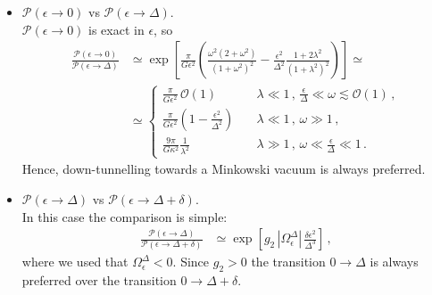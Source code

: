 \documentclass[11pt,a4paper]{article}
\begin{document}
\begin{itemize}
\item $\mathcal{P}(\epsilon \rightarrow 0)$ vs $\mathcal{P}(\epsilon \rightarrow \Delta)$.\\
$\mathcal{P}\left(\epsilon \rightarrow 0\right)$ is exact in $\epsilon$, so
\begin{align}
\frac{\mathcal{P}\left(\epsilon \rightarrow 0\right)}{\mathcal{P}\left(\epsilon \rightarrow\Delta\right)} & \simeq \exp\left[\frac{\pi}{G \epsilon^2} \left(\frac{\omega^2(2 + \omega^2)}{(1 + \omega^2)^2} - \frac{\epsilon^2}{\Delta^2} \frac{1 + 2 \lambda^2}{(1 + \lambda^2)^2}\right)\right] \simeq \nonumber\\
& \simeq \begin{cases} \frac{\pi}{G \epsilon^2} \, \mathcal{O}(1) \quad &\lambda \ll 1 \,, \, \frac{\epsilon}{\Delta} \ll \omega \lesssim \mathcal{O}(1) \,, \\
\frac{\pi}{G \epsilon^2} \left(1 - \frac{\epsilon^2}{\Delta^2}\right)  \quad &\lambda \ll 1 \,, \, \omega \gg 1 \,, \\
\frac{9 \pi}{G \kappa^2} \frac{1}{\lambda^2} \quad &\lambda \gg 1 \,, \, \omega \ll \frac{\epsilon}{\Delta} \ll 1 \,.
\end{cases}
\end{align}
Hence, down-tunnelling towards a Minkowski vacuum is always preferred.

\item $\mathcal{P}(\epsilon \rightarrow \Delta)$ vs $\mathcal{P}(\epsilon \rightarrow \Delta + \delta)$.\\
In this case the comparison is simple:
\begin{align}
\frac{\mathcal{P}\left(\epsilon \rightarrow \Delta\right)}{\mathcal{P}\left(\epsilon \rightarrow \Delta + \delta\right)} & \simeq \exp\left[g_2 \, \left|\Omega_{\epsilon}^{\Delta}\right| \, \frac{\delta \epsilon^2}{\Delta^3}\right] \,,
\end{align}
where we used that $\Omega_{\epsilon}^{\Delta} < 0$. Since $g_2 > 0$ the transition $0 \rightarrow \Delta$ is always preferred over the transition $0 \rightarrow \Delta + \delta$.


\end{itemize}
\end{document}
